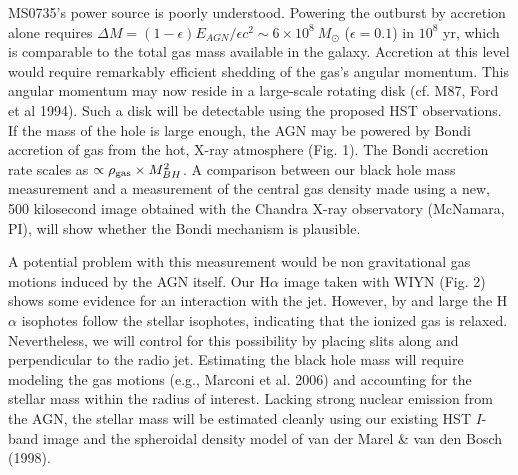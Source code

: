 \documentclass[12pt]{article}
\begin{document}
MS0735's power source is poorly understood.  
Powering the outburst by accretion alone requires $\Delta M =(1-\epsilon)E_{AGN}/\epsilon c^2\sim 6\times 10^8~ M_\odot$ ($\epsilon =0.1$)
in $10^8$ yr, which is comparable to the total gas mass available in the galaxy.  Accretion at this level would require remarkably efficient shedding
of the gas's angular momentum.  This angular momentum may now reside in 
a large-scale rotating disk (cf. M87, Ford et al 1994).  Such a disk will be detectable using the proposed HST observations. 
If the mass of the hole is large enough,  the AGN may be powered by Bondi accretion of gas from the hot, X-ray atmosphere (Fig. 1).  
The Bondi accretion rate scales as $\propto \rho_{\rm gas}\times M_{BH}^2$.
A comparison between our black hole mass measurement and
a measurement of the central gas density made using a new, 500 kilosecond image obtained with the Chandra X-ray observatory (McNamara, PI),
 will show whether the Bondi mechanism is plausible.   

A potential problem with this measurement would be non gravitational gas motions induced by the AGN itself.  Our H$\alpha$ image taken with WIYN (Fig. 2) shows some  evidence
for an interaction with the jet.  However, by and large the H$\alpha$ isophotes follow the stellar isophotes, indicating that the 
ionized gas is relaxed.   Nevertheless, we will control for this possibility by placing slits along and perpendicular to
the radio jet.  Estimating the black hole mass will require modeling the gas motions (e.g., Marconi et al. 2006) and accounting for the stellar
mass within the radius of interest.  Lacking strong nuclear emission from the AGN, the stellar mass will be estimated cleanly using our existing HST $I$-band image and 
the spheroidal density model of van der Marel \& van den Bosch (1998). 
\end{document}
